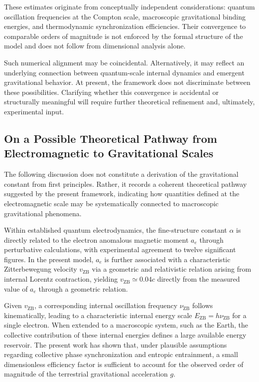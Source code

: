 \documentclass[12pt,letterpaper]{article}
\begin{document}
These estimates originate from conceptually independent considerations: quantum oscillation frequencies at the Compton scale, macroscopic gravitational binding energies, and thermodynamic synchronization efficiencies. Their convergence to comparable orders of magnitude is not enforced by the formal structure of the model and does not follow from dimensional analysis alone.

Such numerical alignment may be coincidental. Alternatively, it may reflect an underlying connection between quantum-scale internal dynamics and emergent gravitational behavior. At present, the framework does not discriminate between these possibilities. Clarifying whether this convergence is accidental or structurally meaningful will require further theoretical refinement and, ultimately, experimental input.


\subsection{On a Possible Theoretical Pathway from Electromagnetic to Gravitational Scales}
The following discussion does not constitute a derivation of the gravitational constant from first principles. Rather, it records a coherent theoretical pathway suggested by the present framework, indicating how quantities defined at the electromagnetic scale may be systematically connected to macroscopic gravitational phenomena.

Within established quantum electrodynamics, the fine-structure constant $\alpha$ is directly related to the electron anomalous magnetic moment $a_e$ through perturbative calculations, with experimental agreement to twelve significant figures. In the present model, $a_e$ is further associated with a characteristic Zitterbewegung velocity $v_{\mathrm{ZB}}$ via a geometric and relativistic relation arising from internal Lorentz contraction, yielding $v_{\mathrm{ZB}} \simeq 0.04c$ directly from the measured value of $a_e$ through a geometric relation.

Given $v_{\mathrm{ZB}}$, a corresponding internal oscillation frequency $\nu_{\mathrm{ZB}}$ follows kinematically, leading to a characteristic internal energy scale $E_{\mathrm{ZB}} = h \nu_{\mathrm{ZB}}$ for a single electron. When extended to a macroscopic system, such as the Earth, the collective contribution of these internal energies defines a large available energy reservoir. The present work has shown that, under plausible assumptions regarding collective phase synchronization and entropic entrainment, a small dimensionless efficiency factor is sufficient to account for the observed order of magnitude of the terrestrial gravitational acceleration $g$.
\end{document}
